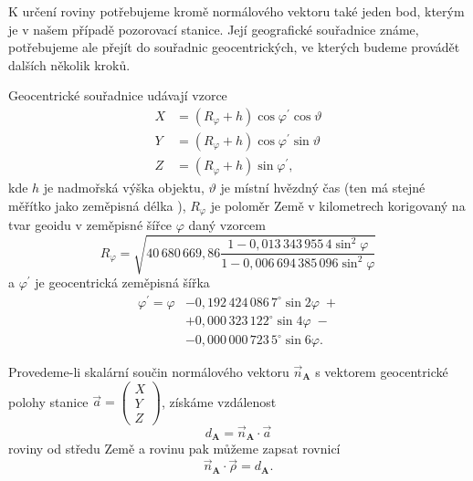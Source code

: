 \smallskip

K určení roviny potřebujeme kromě normálového vektoru také jeden bod, kterým je v našem případě pozorovací stanice. Její geografické souřadnice známe, potřebujeme ale přejít do souřadnic geocentrických, ve kterých budeme provádět dalších několik kroků.

Geocentrické souřadnice udávají vzorce \cite{ceplecha}
\begin{equation}
    \begin{aligned}
        X & =(R_\varphi+h)\cos{\varphi^\prime}\cos{\vartheta} \\
        Y & =(R_\varphi+h)\cos{\varphi^\prime}\sin{\vartheta} \\
        Z & =(R_\varphi+h)\sin{\varphi^\prime}\text{,}
    \end{aligned}
    \label{eqn:photo:geo_xyz}
\end{equation}
kde $h$ je nadmořská výška objektu, $\vartheta$ je místní hvězdný čas (ten má stejné měřítko jako zeměpisná délka \cite{ceplecha}), $R_\varphi$ je poloměr Země v kilometrech korigovaný na tvar geoidu v zeměpisné šířce $\varphi$ daný vzorcem \cite{ceplecha}
\begin{equation}
    R_\varphi=\sqrt{40\,680\,669{,}86\frac{1-0{,}013\,343\,955\,4 \sin^2{\varphi}}{1-0{,}006\,694\,385\,096 \sin^2{\varphi}}}
\end{equation}
a $\varphi^\prime$ je geocentrická zeměpisná šířka \cite{ceplecha}
\begin{equation}
    \begin{aligned}
        \varphi^\prime=\varphi & -0{,}192\,424\,086\,7^\circ \sin{2\varphi}\;+      \\
                               & +0{,}000\,323\,122^\circ \sin{4\varphi}\;-         \\
                               & -0{,}000\,000\,723\,5^\circ \sin{6\varphi}\text{.}
    \end{aligned}
\end{equation}

Provedeme-li skalární součin normálového vektoru $\vec{n}_\mathbf{A}$ s vektorem geocentrické polohy stanice $\vec{a}=\left(\begin{smallmatrix}
            X\\Y\\Z
        \end{smallmatrix}\right)$, získáme vzdálenost
\begin{equation}
    d_\mathbf{A}=\vec{n}_\mathbf{A}\cdot\vec{a}
\end{equation}
roviny od středu Země \cite{ceplecha} a rovinu pak můžeme zapsat rovnicí \cite{ceplecha}
\begin{equation}
    \vec{n}_\mathbf{A}\cdot\vec{\rho}=d_\mathbf{A}\text{.}
    \label{eqn:photo:plane_a}
\end{equation}

